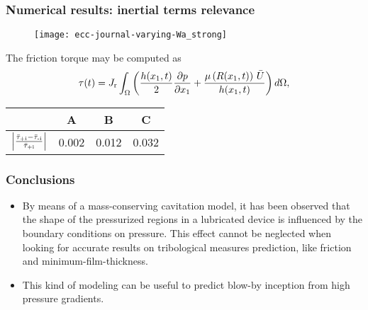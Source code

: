 \documentclass[10pt,aspectratio=169]{beamer}
\begin{document}
\begin{frame}\vspace*{0.5cm}
\frametitle{Numerical results: inertial terms relevance}
\begin{figure}\hspace*{-0.5cm}
	\centering 
	\def\svgwidth{\textwidth}	
	\texttt{[image: ecc-journal-varying-Wa\_strong]}
\end{figure}
\begin{minipage}{.6\linewidth}
	The friction torque may be computed as
\begin{equation*}
\tau(t)=J_\textnormal{r}\int_\Omega\left( \frac{h(x_1,t)}{2}\frac{\partial p}{\partial x_1}+ \frac{\mu\left(R(x_1,t)\right)\,\bar{U}}{h(x_1,t)}\right)d\Omega,
\end{equation*}
\end{minipage}%
\begin{minipage}{.5\linewidth}
\begin{table}[h]
	\begin{center}
		\begin{tabular}{lccc}
			\toprule 
			& A & B & C \\
			\midrule
			$\left|\frac{\bar{\tau}_\textnormal{+i}-\bar{\tau}_\textnormal{-i}}{\bar{\tau}_\textnormal{+i}}\right|$ & 0.002& 0.012&0.032 \\
			\midrule
		\end{tabular} 
	\end{center}
\end{table}
\end{minipage}
\end{frame}  

\begin{frame}
\frametitle{Conclusions}
\begin{itemize}
\item By means of a mass-conserving cavitation model, it has been observed that the shape of the pressurized regions in a lubricated device is influenced by the boundary conditions on pressure. This effect cannot be neglected when looking for accurate results on tribological measures prediction, like friction and minimum-film-thickness.
\item This kind of modeling can be useful to predict blow-by inception from high pressure gradients.
\end{itemize}
\end{frame}  
\end{document}
